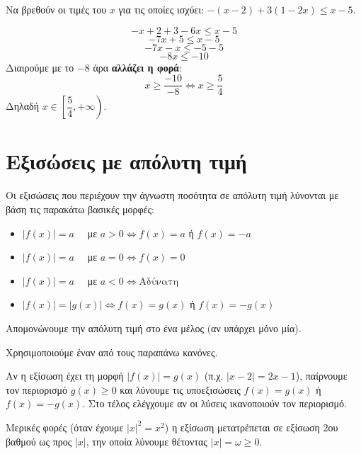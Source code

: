 Να βρεθούν οι τιμές του $x$ για τις οποίες ισχύει: $-(x - 2) + 3(1 - 2x) \leq x - 5$.

\lysh
\[ -x + 2 + 3 - 6x \leq x - 5 \]
\[ -7x + 5 \leq x - 5 \]
\[ -7x - x \leq -5 - 5 \]
\[ -8x \leq -10 \]
Διαιρούμε με το $-8$ άρα \textbf{αλλάζει η φορά}:
\[ x \geq \dfrac{-10}{-8} \Leftrightarrow x \geq \dfrac{5}{4} \]
Δηλαδή $x \in \left[\dfrac{5}{4}, +\infty\right)$.

\section{Εξισώσεις με απόλυτη τιμή}

Οι εξισώσεις που περιέχουν την άγνωστη ποσότητα σε απόλυτη τιμή λύνονται με βάση τις παρακάτω βασικές μορφές:
\begin{itemize}
    \item $|f(x)| = a \quad$ με $a > 0 \Leftrightarrow f(x) = a$ ή $f(x) = -a$
    \item $|f(x)| = a \quad$ με $a = 0 \Leftrightarrow f(x) = 0$
    \item $|f(x)| = a \quad$ με $a < 0 \Leftrightarrow \text{Αδύνατη}$
    \item $|f(x)| = |g(x)| \Leftrightarrow f(x) = g(x)$ ή $f(x) = -g(x)$
\end{itemize}

\bhmata
\begin{bhma}
    \item Απομονώνουμε την απόλυτη τιμή στο ένα μέλος (αν υπάρχει μόνο μία).
    \item Χρησιμοποιούμε έναν από τους παραπάνω κανόνες.
    \item Αν η εξίσωση έχει τη μορφή $|f(x)| = g(x)$ (π.χ. $|x - 2| = 2x - 1$), παίρνουμε τον περιορισμό $g(x) \geq 0$ και λύνουμε τις υποεξισώσεις $f(x) = g(x)$ ή $f(x) = -g(x)$. Στο τέλος ελέγχουμε αν οι λύσεις ικανοποιούν τον περιορισμό.
    \item Μερικές φορές (όταν έχουμε $|x|^2 = x^2$) η εξίσωση μετατρέπεται σε εξίσωση 2ου βαθμού ως προς $|x|$, την οποία λύνουμε θέτοντας $|x| = \omega \geq 0$.
\end{bhma}


